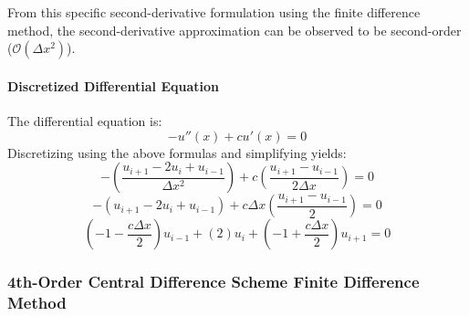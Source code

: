 \documentclass[10pt, reqno]{article}		%
\numberwithin{equation}{section}
\begin{document}
From this specific second-derivative formulation using the finite difference method, the second-derivative approximation can be observed to be second-order ($\mathcal{O}(\Delta x^2)$).

\paragraph{Discretized Differential Equation}
The differential equation is:
\begin{equation}
- u''(x)+cu'(x)=0
\end{equation}
Discretizing using the above formulas and simplifying yields:
\begin{equation}
-\left(\frac{u_{i+1} - 2u_i + u_{i-1}}{\Delta x^2}\right) + c\left(\frac{u_{i+1} - u_{i-1}}{2 \Delta x}\right) = 0
\end{equation}
\begin{equation}
-\left(u_{i+1} - 2u_i + u_{i-1}\right) + c\Delta x\left( \frac{u_{i+1} - u_{i-1}}{2}\right) = 0
\end{equation}
\begin{equation}
\left(-1-\frac{c\Delta x}{2}\right)u_{i-1} + \left(2\right)u_{i} + \left(-1+\frac{c\Delta x}{2}\right)u_{i+1} = 0
\end{equation}

\subsubsection{4th-Order Central Difference Scheme Finite Difference Method}
\end{document}

